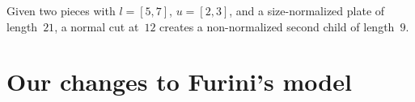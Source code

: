 \documentclass[smallextended]{svjour3}       %
\begin{document}



\begin{example}
Given two pieces with \(l = [5, 7]\), \(u = [2, 3]\), and a size-normalized plate of length~\(21\), a normal cut at~\(12\) creates a non-normalized second child of length~\(9\). %
\end{example}

\begin{comment}
\subsection{Expanded example for thesis proposal}

I need an original plate and about 3~5 pieces.
Ideally the original plate should already be size-normalized, to be fair.
The smallest piece needs to be distant of one in absolute terms, but cannot be on the relatively large side, because this makes harder for an intermediary plate have many replacements.
We may use only squares, but this is kinda boring.
Probably the easiest way is to make a branch of the code in which the code enumerating plates saves which non-normalized plates were replaced by each normalized plate and outputs them.
\end{comment}

\section{Our changes to Furini's model}
\label{sec:enhanced_model}
\end{document}
